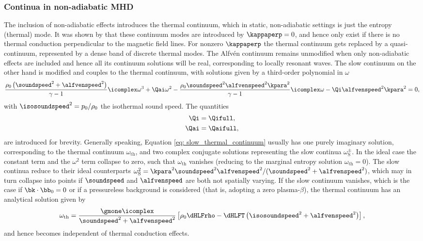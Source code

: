 \subsubsection{Continua in non-adiabatic MHD}
The inclusion of non-adiabatic effects introduces the thermal continuum, which in static, non-adiabatic settings is just the entropy (thermal) mode. It was shown by \citet{vanderlinden1991} that these continuum modes are introduced by $\kappaperp = 0$, and hence only exist if there is no thermal conduction perpendicular to the magnetic field lines. For nonzero $\kappaperp$ the thermal continuum gets replaced by a quasi-continuum, represented by a dense band of discrete thermal modes. The Alfv\'en continuum remains unmodified when only non-adiabatic effects are included and hence all its continuum solutions will be real, corresponding to locally resonant waves. The slow continuum on the other hand is modified and couples to the thermal continuum, with solutions given by a third-order polynomial in $\omega$
\begin{equation}	\label{eq: slow_thermal_continuum}
  \frac{\rho_0 \left(\soundspeed^2 + \alfvenspeed^2\right)}{\gamma - 1}\icomplex\omega^3
  + \Qai\omega^2
  - \frac{\rho_0 \soundspeed^2\alfvenspeed^2 \kpara^2}{\gamma - 1}\icomplex\omega
  - \Qi\alfvenspeed^2 \kpara^2 = 0,
\end{equation}
with $\isosoundspeed^2 = p_0 / \rho_0$ the isothermal sound speed. The quantities
\begin{equation}
  \begin{gathered}
	  \Qi = \Qifull, \\
    \Qai = \Qaifull,
  \end{gathered}
\end{equation}
are introduced for brevity. Generally speaking, Equation \eqref{eq: slow_thermal_continuum} usually has one purely imaginary solution, corresponding to the thermal continuum $\omega_\text{th}$, and two complex conjugate solutions representing the slow continua $\omega_\text{S}^\pm$. In the ideal case the constant term and the $\omega^2$ term collapse to zero, such that $\omega_\text{th}$ vanishes (reducing to the marginal entropy solution $\omega_\text{th} = 0$). The slow continua reduce to their ideal counterparts $\omega_\text{S}^2 = \kpara^2\soundspeed^2\alfvenspeed^2/(\soundspeed^2 + \alfvenspeed^2)$, which may in turn collapse into points if $\soundspeed$ and $\alfvenspeed$ are both not spatially varying. If the slow continuum vanishes, which is the case if $\bk \cdot \bb_0 = 0$ or if a pressureless background is considered (that is, adopting a zero plasma-$\beta$), the thermal continuum has an analytical solution given by
\begin{equation}
	\omega_\text{th} =
    \frac{\gmone\icomplex}{\soundspeed^2 + \alfvenspeed^2}
    \left[\rho_0\dHLFrho - \dHLFT\left(\isosoundspeed^2 + \alfvenspeed^2\right)\right],
\end{equation}
and hence becomes independent of thermal conduction effects.

